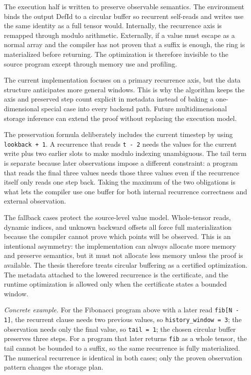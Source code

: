 The execution half is written to preserve observable semantics. The environment
binds the output DefId to a circular buffer so recurrent self-reads and writes
use the same identity as a full tensor would. Internally, the recurrence axis is
remapped through modulo arithmetic. Externally, if a value must escape as a
normal array and the compiler has not proven that a suffix is enough, the ring
is materialized before returning. The optimization is therefore invisible to
the source program except through memory use and profiling.

The current implementation focuses on a primary recurrence axis, but the data
structure anticipates more general windows. This is why the algorithm keeps the
axis and preserved step count explicit in metadata instead of baking a
one-dimensional special case into every backend path. Future multidimensional
storage inference can extend the proof without replacing the execution model.

The preservation formula deliberately includes the current timestep by using
\texttt{lookback + 1}. A recurrence that reads \texttt{t - 2} needs the values
for the current write plus two earlier slots to make modulo indexing
unambiguous. The tail term is separate because later observations impose a
different constraint: a program that reads the final three values needs those
three values even if the recurrence itself only reads one step back. Taking the
maximum of the two obligations is what lets the compiler use one buffer for both
internal recurrence correctness and external observation.

The fallback cases protect the source-level value model. Whole-tensor reads,
dynamic indices, and unknown backward offsets all force full materialization
because the compiler cannot prove which points will be observed. This is an
intentional asymmetry: the implementation can always allocate more memory and
preserve semantics, but it must not allocate less memory unless the proof is
available. The thesis therefore treats circular buffering as a certified
optimization. The metadata attached to the lowered recurrence is the
certificate, and the runtime optimization is allowed only when the certificate
states a bounded window.

\textit{Concrete example.} For the Fibonacci program above with a later read
\texttt{fib[N - 1]}, the recurrent clause needs two previous values, so
\texttt{history\_window = 3}; the observation needs only the final value, so
\texttt{tail = 1}; the chosen circular buffer preserves three steps. For a
program that later returns \texttt{fib} as a whole tensor, the tail cannot be
bounded to a suffix, so the same recurrence is fully materialized. The numerical
recurrence is identical in both cases; only the proven observation pattern
changes the storage plan.

